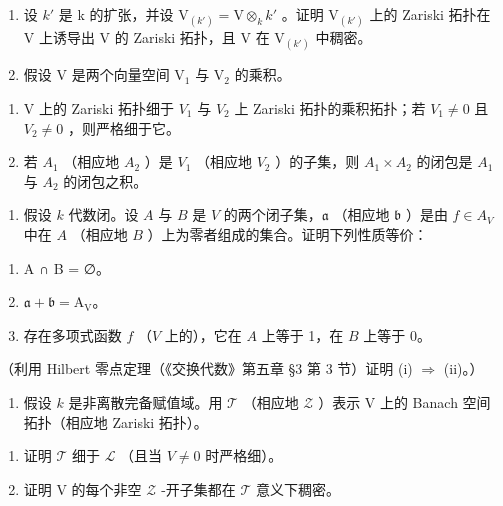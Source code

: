 \begin{enumerate}
\def\labelenumi{\arabic{enumi})}
\item
  设 \(k'\) 是 k 的扩张，并设 \(\mathrm{V}_{(k')} = \mathrm{V} \otimes_k k'\) 。证明 \(\mathrm{V}_{(k')}\) 上的 Zariski 拓扑在 V 上诱导出 V 的 Zariski 拓扑，且 V 在 \(\mathrm{V}_{(k')}\) 中稠密。
\item
  假设 \(\mathrm{V}\) 是两个向量空间 \(\mathrm{V}_1\) 与 \(\mathrm{V}_2\) 的乘积。
\end{enumerate}

\begin{enumerate}
\def\labelenumi{\alph{enumi})}
\item
  V 上的 Zariski 拓扑细于 \(V_{1}\) 与 \(V_{2}\) 上 Zariski 拓扑的乘积拓扑；若 \(V_{1} \neq 0\) 且 \(V_{2} \neq 0\) ，则严格细于它。
\item
  若 \(A_{1}\) （相应地 \(A_{2}\) ）是 \(V_{1}\) （相应地 \(V_{2}\) ）的子集，则 \(A_{1} \times A_{2}\) 的闭包是 \(A_{1}\) 与 \(A_{2}\) 的闭包之积。
\end{enumerate}

\begin{enumerate}
\def\labelenumi{\arabic{enumi})}
\setcounter{enumi}{2}
\tightlist
\item
  假设 \(k\) 代数闭。设 \(A\) 与 \(B\) 是 \(V\) 的两个闭子集，\(\mathfrak{a}\) （相应地 \(\mathfrak{b}\) ）是由 \(f \in A_V\) 中在 \(A\) （相应地 \(B\) ）上为零者组成的集合。证明下列性质等价：
\end{enumerate}

\begin{enumerate}
\def\labelenumi{(\roman{enumi})}
\item
  A ∩ B = ∅。
\item
  \(\mathfrak{a} + \mathfrak{b} = \mathrm{A_V}\)。
\item
  存在多项式函数 \(f\) （\(V\) 上的），它在 \(A\) 上等于 1，在 \(B\) 上等于 0。
\end{enumerate}

（利用 Hilbert 零点定理（《交换代数》第五章 §3 第 3 节）证明 (i) \(\Longrightarrow\) (ii)。）

\begin{enumerate}
\def\labelenumi{\arabic{enumi})}
\setcounter{enumi}{3}
\tightlist
\item
  假设 \(k\) 是非离散完备赋值域。用 \(\mathcal{T}\) （相应地 \(\mathcal{Z}\) ）表示 V 上的 Banach 空间拓扑（相应地 Zariski 拓扑）。
\end{enumerate}

\begin{enumerate}
\def\labelenumi{\alph{enumi})}
\item
  证明 \(\mathcal{T}\) 细于 \(\mathcal{L}\) （且当 \(V \neq 0\) 时严格细）。
\item
  证明 V 的每个非空 \(\mathcal{Z}\) -开子集都在 \(\mathcal{T}\) 意义下稠密。
\end{enumerate}

